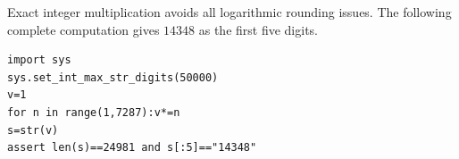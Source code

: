 Exact integer multiplication avoids all logarithmic rounding issues. The following complete computation gives $\boxed{14348}$ as the first five digits.\begin{verbatim}
import sys
sys.set_int_max_str_digits(50000)
v=1
for n in range(1,7287):v*=n
s=str(v)
assert len(s)==24981 and s[:5]=="14348"
\end{verbatim}
